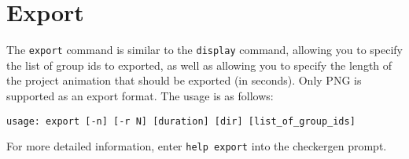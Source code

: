 \documentclass[12pt,titlepage]{article}
\begin{document}
\section{Export}
The \texttt{export} command is similar to the \texttt{display}
command, allowing you to specify the list of group ids to exported, as
well as allowing you to specify the length of the project animation
that should be exported (in seconds). Only PNG is supported as an
export format. The usage is as follows:
\begin{lstlisting}
usage: export [-n] [-r N] [duration] [dir] [list_of_group_ids]
\end{lstlisting}
For more detailed information, enter \lstinline{help export} into the
checkergen prompt.
\end{document}
